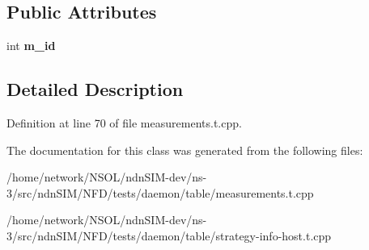 \subsection*{Public Attributes}
\begin{DoxyCompactItemize}
\item 
int {\bfseries m\+\_\+id}\hypertarget{classnfd_1_1tests_1_1DummyStrategyInfo2_a94e7ae36d3da9aca88cfcb202234bd07}{}\label{classnfd_1_1tests_1_1DummyStrategyInfo2_a94e7ae36d3da9aca88cfcb202234bd07}

\end{DoxyCompactItemize}


\subsection{Detailed Description}


Definition at line 70 of file measurements.\+t.\+cpp.



The documentation for this class was generated from the following files\+:\begin{DoxyCompactItemize}
\item 
/home/network/\+N\+S\+O\+L/ndn\+S\+I\+M-\/dev/ns-\/3/src/ndn\+S\+I\+M/\+N\+F\+D/tests/daemon/table/measurements.\+t.\+cpp\item 
/home/network/\+N\+S\+O\+L/ndn\+S\+I\+M-\/dev/ns-\/3/src/ndn\+S\+I\+M/\+N\+F\+D/tests/daemon/table/strategy-\/info-\/host.\+t.\+cpp\end{DoxyCompactItemize}
